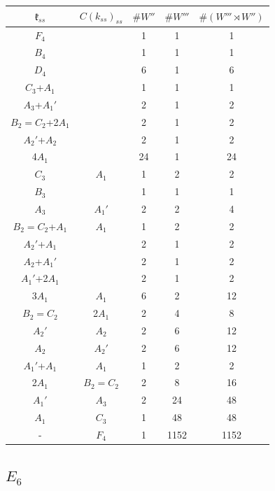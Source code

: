 \documentclass[12pt]{report}
\begin{document}
\begin{appendix}
{\begin{tabular}{ccccc}$\mathfrak{k}_{ss}$& $C(k_{ss})_{ss}$ & $\#W''$ &$\#W'''$&$\#(W'''\rtimes W'')$\\\hline$F_4$ &  & 1 & 1 & 1 \\
$B_4$ &  & 1 & 1 & 1 \\
$D_4$ &  & 6 & 1 & 6 \\
$C_3$+$A_1$ &  & 1 & 1 & 1 \\
$A_3$+$A_1'$ &  & 2 & 1 & 2 \\
$B_2=C_2$+2$A_1$ &  & 2 & 1 & 2 \\
$A_2'$+$A_2$ &  & 2 & 1 & 2 \\
4$A_1$ &  & 24 & 1 & 24 \\
$C_3$ & $A_1$ & 1 & 2 & 2 \\
$B_3$ &  & 1 & 1 & 1 \\
$A_3$ & $A_1'$ & 2 & 2 & 4 \\
$B_2=C_2$+$A_1$ & $A_1$ & 1 & 2 & 2 \\
$A_2'$+$A_1$ &  & 2 & 1 & 2 \\
$A_2$+$A_1'$ &  & 2 & 1 & 2 \\
$A_1'$+2$A_1$ &  & 2 & 1 & 2 \\
3$A_1$ & $A_1$ & 6 & 2 & 12 \\
$B_2=C_2$ & 2$A_1$ & 2 & 4 & 8 \\
$A_2'$ & $A_2$ & 2 & 6 & 12 \\
$A_2$ & $A_2'$ & 2 & 6 & 12 \\
$A_1'$+$A_1$ & $A_1$ & 1 & 2 & 2 \\
2$A_1$ & $B_2=C_2$ & 2 & 8 & 16 \\
$A_1'$ & $A_3$ & 2 & 24 & 48 \\
$A_1$ & $C_3$ & 1 & 48 & 48 \\
- & $F_4$ & 1 & 1152 & 1152 \\
\end{tabular}


\subsection{$E_6$}


}
\end{appendix}
\end{document}
